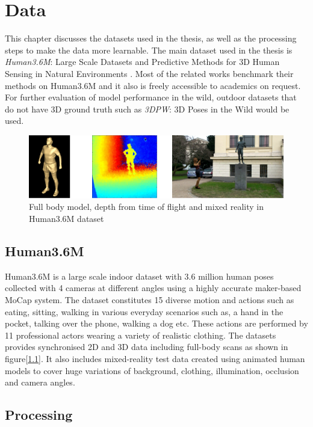 \chapter{Data}
\label{chap:data}
This chapter discusses the datasets used in the thesis, as well as the processing steps to make the data more learnable. The main dataset used in the thesis is \textit{Human3.6M}: Large Scale Datasets and Predictive Methods for 3D Human Sensing in Natural Environments \cite{H3.6}. Most of the related works benchmark their methods on Human3.6M and it also is freely accessible to academics on request. For further evaluation of model performance in the wild, outdoor datasets that do not have 3D ground truth such as \textit{3DPW}: 3D Poses in the Wild \cite{3dpw} would be used.

\begin{figure}[h]
    \centering
    \includegraphics[width=\textwidth]{figures/h36/modlities.png}
    \caption{Full body model, depth from time of flight and mixed reality in Human3.6M dataset}
    \label{fig:h36_modality}
\end{figure}

\section{Human3.6M}
Human3.6M is a large scale indoor dataset with 3.6 million human poses collected with 4 cameras at different angles using a highly accurate maker-based \ac{MoCap} system. The dataset constitutes 15 diverse motion and actions such as eating, sitting, walking in various everyday scenarios such as, a hand in the pocket, talking over the phone, walking a dog etc. These actions are performed by 11 professional actors wearing a variety of realistic clothing. The datasets provides synchronised 2D and 3D data including full-body scans as shown in figure[\ref{fig:h36_modality}]. It also includes mixed-reality test data created using animated human models to cover huge variations of background, clothing, illumination, occlusion and camera angles. 


\section{Processing}


